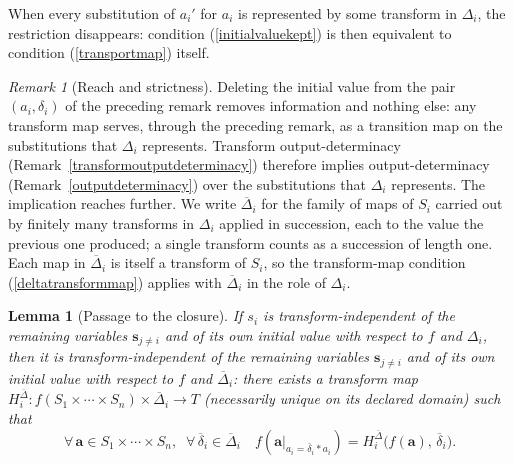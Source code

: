 \documentclass{article}
\newtheorem{lemma}[proposition]{Lemma}
\theoremstyle{definition}
\theoremstyle{remark}
\newtheorem{remark}[proposition]{Remark}
\begin{document}
\noindent When every substitution of $a_i'$ for $a_i$ is represented by some transform in $\Delta_i$, the restriction disappears: condition (\ref{initialvaluekept}) is then equivalent to condition (\ref{transportmap}) itself.


\begin{remark}[Reach and strictness]
\label{reachstrictness}
Deleting the initial value from the pair $(a_i, \delta_i)$ of the preceding remark removes information and nothing else: any transform map serves, through the preceding remark, as a transition map on the substitutions that $\Delta_i$ represents. Transform output-determinacy (Remark~\ref{transformoutputdeterminacy}) therefore implies output-determinacy (Remark~\ref{outputdeterminacy}) over the substitutions that $\Delta_i$ represents. The implication reaches further.
We write $\overline{\Delta}_i$ for the family of maps of $S_i$ carried out by finitely many transforms in $\Delta_i$ applied in succession, each to the value the previous one produced; a single transform counts as a succession of length one. Each map in $\overline{\Delta}_i$ is itself a transform of $S_i$, so the transform-map condition (\ref{deltatransformmap}) applies with $\overline{\Delta}_i$ in the role of $\Delta_i$.
\end{remark}

\begin{lemma}[Passage to the closure]
\label{closurelemma}
If $s_i$ is transform-independent of the remaining variables $\boldsymbol{s}_{j \neq i}$ and of its own initial value with respect to $f$ and $\Delta_i$, then it is transform-independent of the remaining variables $\boldsymbol{s}_{j \neq i}$ and of its own initial value with respect to $f$ and $\overline{\Delta}_i$: there exists a transform map $H_i^{\overline{\Delta}} \colon f(S_1 \times \cdots \times S_n) \times \overline{\Delta}_i \to T$ (necessarily unique on its declared domain) such that
\begin{equation}
\label{closuretransformmap}
\forall\, \boldsymbol{a} \in S_1 \times \cdots \times S_n,\;\; \forall\, \overline{\delta}_i \in \overline{\Delta}_i \quad
f(\boldsymbol{a}|_{a_i = \overline{\delta}_i \ast a_i}) = H_i^{\overline{\Delta}}\bigl(f(\boldsymbol{a}),\, \overline{\delta}_i\bigr).
\end{equation}
\end{lemma}
\end{document}
